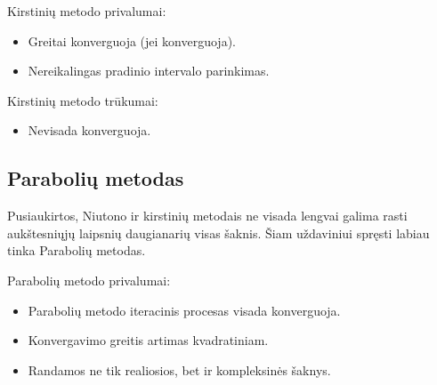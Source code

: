 Kirstinių metodo privalumai:
\begin{itemize}
  \item Greitai konverguoja (jei konverguoja).
  \item Nereikalingas pradinio intervalo parinkimas.
\end{itemize}
Kirstinių metodo trūkumai:
\begin{itemize}
  \item Nevisada konverguoja.
\end{itemize}




\subsection{Parabolių metodas}


Pusiaukirtos, Niutono ir kirstinių metodais ne visada lengvai galima
rasti aukštesniųjų laipsnių daugianarių visas šaknis. Šiam
uždaviniui spręsti labiau tinka Parabolių  metodas.


Parabolių metodo privalumai:
\begin{itemize}
  \item Parabolių metodo iteracinis procesas visada konverguoja.
  \item Konvergavimo greitis artimas kvadratiniam.
  \item Randamos ne tik realiosios, bet ir kompleksinės šaknys.
\end{itemize}
